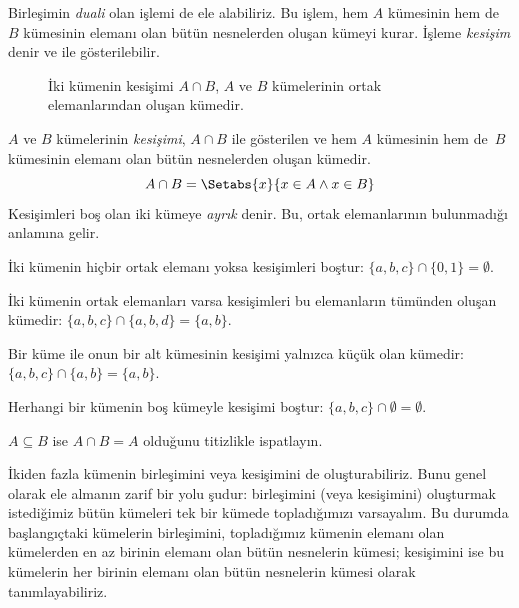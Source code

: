 \begin{explain}
Birleşimin \emph{duali} olan işlemi de ele alabiliriz. Bu işlem, hem $A$
kümesinin hem de $B$ kümesinin elemanı olan bütün nesnelerden oluşan kümeyi kurar. İşleme
\emph{kesişim} denir ve  ile gösterilebilir.
\begin{figure}
  \caption{İki kümenin kesişimi $A \cap B$, $A$ ve $B$ kümelerinin ortak
    elemanlarından oluşan kümedir.}
\end{figure}
\end{explain}

\begin{defn}[Kesişim]
$A$ ve $B$ kümelerinin \emph{kesişimi}, $A \cap B$ ile gösterilen ve hem
$A$ kümesinin hem de~$B$ kümesinin elemanı olan bütün nesnelerden oluşan
kümedir.
\[
A \cap B = \Setabs{x}{x \in A \land x \in B}
\]
Kesişimleri boş olan iki kümeye \emph{ayrık} denir. Bu, ortak elemanlarının
bulunmadığı anlamına gelir.
\end{defn}

\begin{ex}
İki kümenin hiçbir ortak elemanı yoksa kesişimleri boştur:
$\{ a, b, c\} \cap \{ 0, 1\} = \emptyset$.

İki kümenin ortak elemanları varsa kesişimleri bu elemanların tümünden oluşan
kümedir:
$\{a, b, c \} \cap \{a, b, d \} = \{a, b\}$.

Bir küme ile onun bir alt kümesinin kesişimi yalnızca küçük olan kümedir:
$\{a, b, c\} \cap \{a, b\} = \{a, b\}$.

Herhangi bir kümenin boş kümeyle kesişimi boştur:
$\{a, b, c \} \cap \emptyset = \emptyset$.
\end{ex}

\begin{prob}
$A \subseteq B$ ise $A \cap B = A$ olduğunu titizlikle ispatlayın.
\end{prob}

\begin{explain}
İkiden fazla kümenin birleşimini veya kesişimini de oluşturabiliriz. Bunu genel
olarak ele almanın zarif bir yolu şudur: birleşimini (veya kesişimini)
oluşturmak istediğimiz bütün kümeleri tek bir kümede topladığımızı varsayalım.
Bu durumda başlangıçtaki kümelerin birleşimini, topladığımız kümenin elemanı
olan kümelerden en az birinin elemanı olan bütün nesnelerin kümesi; kesişimini
ise bu kümelerin her birinin elemanı olan bütün nesnelerin kümesi olarak
tanımlayabiliriz.
\end{explain}

